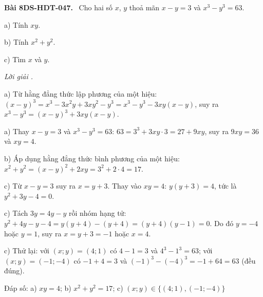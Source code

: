 \documentclass[12pt,a4paper]{article}
\newenvironment{problem}[1][]{\par\medskip\noindent\textbf{Bài #1.}\ }{\par}
\newenvironment{solution}[1][]{\par\noindent\textit{Lời giải #1.}\par}{\par}
\begin{document}
\begin{problem}[8DS-HDT-047]
Cho hai số $x$, $y$ thoả mãn $x - y = 3$ và $x^3 - y^3 = 63$.

a) Tính $xy$.

b) Tính $x^2 + y^2$.

c) Tìm $x$ và $y$.

\begin{solution}
a) Từ hằng đẳng thức lập phương của một hiệu: $(x - y)^3 = x^3 - 3x^2y + 3xy^2 - y^3 = x^3 - y^3 - 3xy(x - y)$, suy ra $x^3 - y^3 = (x - y)^3 + 3xy(x - y)$.

a) Thay $x - y = 3$ và $x^3 - y^3 = 63$: $63 = 3^3 + 3xy \cdot 3 = 27 + 9xy$, suy ra $9xy = 36$ và $xy = 4$.

b) Áp dụng hằng đẳng thức bình phương của một hiệu: $x^2 + y^2 = (x - y)^2 + 2xy = 3^2 + 2 \cdot 4 = 17$.

c) Từ $x - y = 3$ suy ra $x = y + 3$. Thay vào $xy = 4$: $y(y + 3) = 4$, tức là $y^2 + 3y - 4 = 0$.

c) Tách $3y = 4y - y$ rồi nhóm hạng tử: $y^2 + 4y - y - 4 = y(y + 4) - (y + 4) = (y + 4)(y - 1) = 0$. Do đó $y = -4$ hoặc $y = 1$, suy ra $x = y + 3 = -1$ hoặc $x = 4$.

c) Thử lại: với $(x; y) = (4; 1)$ có $4 - 1 = 3$ và $4^3 - 1^3 = 63$; với $(x; y) = (-1; -4)$ có $-1 + 4 = 3$ và $(-1)^3 - (-4)^3 = -1 + 64 = 63$ (đều đúng).

Đáp số: a) $\boxed{xy = 4}$; b) $\boxed{x^2 + y^2 = 17}$; c) $\boxed{(x; y) \in \{(4; 1), (-1; -4)\}}$
\end{solution}
\end{problem}
\end{document}
